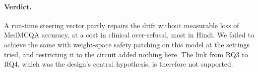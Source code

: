 \paragraph{Verdict.} A run-time steering vector partly repairs the drift without measurable loss of MedMCQA accuracy, at a cost in clinical over-refusal, most in Hindi. We failed to achieve the same with weight-space safety patching on this model at the settings tried, and restricting it to the circuit added nothing here. The link from RQ3 to RQ4, which was the design's central hypothesis, is therefore not supported.
